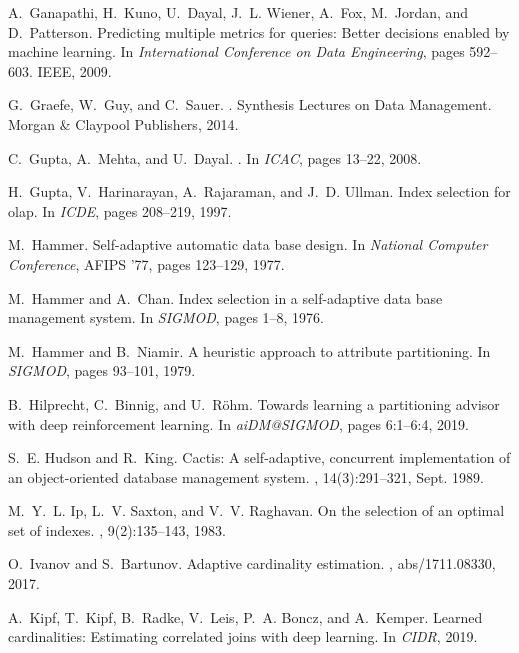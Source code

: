 \documentclass[11pt,times]{article}
\begin{document}
\begin{thebibliography}{10}
A.~Ganapathi, H.~Kuno, U.~Dayal, J.~L. Wiener, A.~Fox, M.~Jordan, and
  D.~Patterson.
\newblock Predicting multiple metrics for queries: Better decisions enabled by
  machine learning.
\newblock In {\em International Conference on Data Engineering}, pages
  592--603. IEEE, 2009.

G.~Graefe, W.~Guy, and C.~Sauer.
.
\newblock Synthesis Lectures on Data Management. Morgan {\&} Claypool
  Publishers, 2014.

C.~Gupta, A.~Mehta, and U.~Dayal.
.
\newblock In {\em ICAC}, pages 13--22, 2008.

H.~Gupta, V.~Harinarayan, A.~Rajaraman, and J.~D. Ullman.
\newblock Index selection for olap.
\newblock In {\em ICDE}, pages 208--219, 1997.

M.~Hammer.
\newblock Self-adaptive automatic data base design.
\newblock In {\em National Computer Conference}, AFIPS '77, pages 123--129,
  1977.

M.~Hammer and A.~Chan.
\newblock Index selection in a self-adaptive data base management system.
\newblock In {\em SIGMOD}, pages 1--8, 1976.

M.~Hammer and B.~Niamir.
\newblock A heuristic approach to attribute partitioning.
\newblock In {\em SIGMOD}, pages 93--101, 1979.

B.~Hilprecht, C.~Binnig, and U.~R{\"{o}}hm.
\newblock Towards learning a partitioning advisor with deep reinforcement
  learning.
\newblock In {\em aiDM@SIGMOD}, pages 6:1--6:4, 2019.

S.~E. Hudson and R.~King.
\newblock Cactis: A self-adaptive, concurrent implementation of an
  object-oriented database management system.
, 14(3):291--321, Sept. 1989.

M.~Y.~L. Ip, L.~V. Saxton, and V.~V. Raghavan.
\newblock On the selection of an optimal set of indexes.
, 9(2):135--143, 1983.

O.~Ivanov and S.~Bartunov.
\newblock Adaptive cardinality estimation.
, abs/1711.08330, 2017.

A.~Kipf, T.~Kipf, B.~Radke, V.~Leis, P.~A. Boncz, and A.~Kemper.
\newblock Learned cardinalities: Estimating correlated joins with deep
  learning.
\newblock In {\em {CIDR}}, 2019.


\end{thebibliography}
\end{document}
